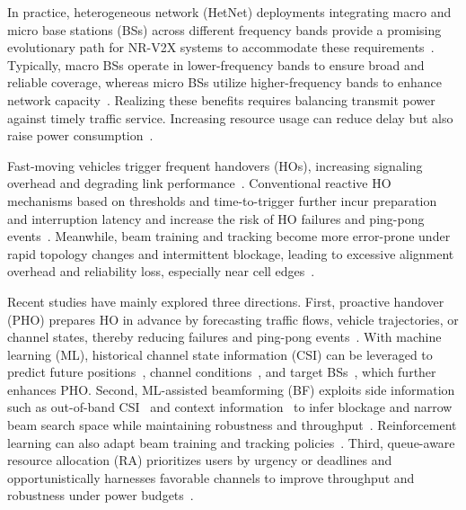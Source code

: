 \documentclass[conference, a4paper]{IEEEtran}
\newcommand{\rev}[1]{\textcolor{revisioncolor}{{}#1}}
\newif\ifshowdeletions
\newcommand{\currentdel}[1]{\ifshowdeletions\textcolor{deletioncolor}{\sout{#1}}\fi}
\theoremstyle{remark}
\begin{document}
In practice, heterogeneous network (HetNet) deployments integrating macro and micro base stations (BSs) across different frequency bands provide a promising evolutionary path for NR-V2X systems to accommodate these requirements~\cite{3GPP-TR-38.913}. Typically, macro BSs operate in lower-frequency bands to ensure broad and reliable coverage, whereas micro BSs utilize higher-frequency bands to enhance network capacity~\cite{xu2021survey}. 
\currentdel{Such a two-tier deployment can jointly improve throughput and coverage for V2X scenarios, while reducing data service latency and energy consumption through spatial reuse and shorter links}
\rev{Realizing these benefits requires balancing transmit power against timely traffic service. Increasing resource usage can reduce delay but also raise power consumption~\cite{niu2015}.}\par
\currentdel{However, vehicular HetNets face challenges under high mobility, with densely deployed small cells and links sensitive to blockage and beam misalignment.} Fast-moving vehicles trigger frequent handovers (HOs), increasing signaling overhead and degrading link performance~\cite{hasan2018frequent,nan2023}. 
Conventional reactive HO mechanisms based on thresholds and time-to-trigger further incur preparation and interruption latency and increase the risk of HO failures and ping-pong events~\cite{lee2020prediction}. 
Meanwhile, beam training and tracking become more error-prone under rapid topology changes and intermittent blockage, leading to excessive alignment overhead and reliability loss, especially near cell edges~\cite{elayach2014twc,alrabeiah2020tcom}. 
\currentdel{Although 5G-Advanced has introduced L1/L2-triggered mobility and fast conditional handover, energy-efficient {C}oordination of hand{O}ver, {B}eamforming and {R}esource {A}llocation (COBRA) in vehicular HetNets is still underexplored~\mbox{\cite{manalastas2020go, fiandrino2023cho,cho2022stanczak}}.}

Recent studies \rev{have mainly explored}\currentdel{mainly advance} three directions.
First, proactive handover (PHO) prepares HO in advance by forecasting traffic flows, vehicle trajectories, or channel states, thereby reducing failures and ping-pong events~\cite{lee2020prediction,sun2018energy}. With machine learning (ML), historical channel state information (CSI) can be leveraged to predict future positions~\cite{AEPHORA2025ICC}, channel conditions~\cite{ryden2023}, and target BSs~\cite{park2024mobility}, which further enhances PHO.
Second, ML-assisted beamforming (BF) exploits side information such as out-of-band CSI~\cite{alrabeiah2020tcom} and context information~\cite{va2017inverse} to infer blockage and narrow beam search space while maintaining robustness and throughput~\cite{wang2024beam}. Reinforcement learning can also adapt beam training and tracking policies~\cite{xie2024TVT}.
Third, queue-aware resource allocation (RA) prioritizes users by urgency or deadlines and opportunistically harnesses favorable channels to improve throughput and robustness under power budgets~\cite{liu2022queueaware,zhang2019qosaware}. 
\end{document}
